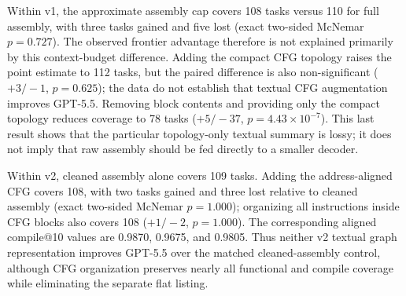 \documentclass[11pt]{article}
\begin{document}
\begin{table}[t]
\centering
\small
\caption{GPT-5.5 prompt-representation ablation on the same 154 tasks, with ten candidates per task. \emph{Covered} is the pass@10 numerator. Within-version comparisons are controlled; direct v1--v2 comparisons remain descriptive because the cleaner and system prompt changed.}
\label{tab:gptablation}
\end{table}

Within v1, the approximate assembly cap covers 108 tasks versus 110 for full assembly, with three tasks gained and five lost (exact two-sided McNemar \(p=0.727\)). The observed frontier advantage therefore is not explained primarily by this context-budget difference. Adding the compact CFG topology raises the point estimate to 112 tasks, but the paired difference is also non-significant (\(+3/-1\), \(p=0.625\)); the data do not establish that textual CFG augmentation improves GPT-5.5. Removing block contents and providing only the compact topology reduces coverage to 78 tasks (\(+5/-37\), \(p=4.43{\times}10^{-7}\)). This last result shows that the particular topology-only textual summary is lossy; it does not imply that raw assembly should be fed directly to a smaller decoder.

Within v2, cleaned assembly alone covers 109 tasks. Adding the address-aligned CFG covers 108, with two tasks gained and three lost relative to cleaned assembly (exact two-sided McNemar \(p=1.000\)); organizing all instructions inside CFG blocks also covers 108 (\(+1/-2\), \(p=1.000\)). The corresponding aligned compile@10 values are 0.9870, 0.9675, and 0.9805. Thus neither v2 textual graph representation improves GPT-5.5 over the matched cleaned-assembly control, although CFG organization preserves nearly all functional and compile coverage while eliminating the separate flat listing.
\end{document}
